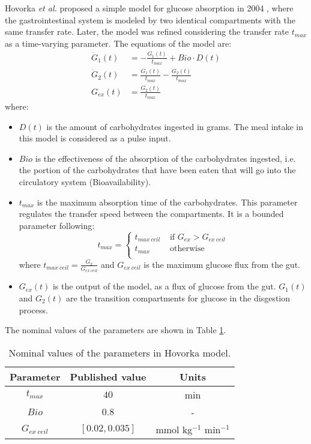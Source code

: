 Hovorka \textit{et al.} proposed a simple model for glucose absorption in 2004 \cite{hovorka2004nonlinear}, where the gastrointestinal system is modeled by two identical compartments with the same transfer rate. Later, the model was refined \cite{simuladorhovorka} considering the transfer rate $t_{max}$ as a time-varying parameter. The equations of the model are:
\begin{align}
	\dot{G}_{1}(t) &=-\frac{G_{1}(t)}{t_{max}}+Bio\cdot D(t) \label{eq:hovorkagut1}\\
	\dot{G}_{2}(t) &=\frac{G_{1}(t)}{t_{max}}-\frac{G_{2}(t)}{t_{max}} \label{eq:hovorkagut2}\\
	G_{ex}(t) &=\frac{G_{2}(t)}{t_{max}} \label{eq:hovorkagut3}
\end{align}
where:
\begin{itemize}
	\item \textbf{$D(t)$} is the amount of carbohydrates ingested in grams. The meal intake in this model is considered as a pulse input.
	\item \textbf{$Bio$} is the effectiveness of the absorption of the carbohydrates ingested, i.e. the portion of the carbohydrates that have been eaten that will go into the circulatory system (Bioavailability).
	\item \textbf{$t_{max}$} is the maximum absorption time of the carbohydrates. This parameter regulates the transfer speed between the compartments. It is a bounded parameter following:
	\begin{equation} 
	  t_{max}=\left\{ \begin{array}{cc} 
	  t_{max\ ceil} & \mbox{ if } G_{ex} > G_{ex\ ceil} \\ 
	  t_{max} & \mbox{ otherwise } \\	
	  \end{array} \right.
	\label{eq:hovorkagut4}
	\end{equation}
	where $t_{max\ ceil}=\frac{G_{2}}{G_{ex\ ceil}}$ and $G_{ex\ ceil}$ is the maximum glucose flux from the gut.
	\item \textbf{$G_{ex}(t)$} is the output of the model, as a flux of glucose from the gut. $G_{1}(t)$ and $G_{2}(t)$ are the transition compartments for glucose in the disgestion process.
\end{itemize}
The nominal values of the parameters are shown in Table \ref{tab:hovorkagut}.

\begin{table}[hbtp]
	\centering
		\begin{tabular}{|c c c|}
		\hline 
		Parameter & Published value & Units \\
		\hline 
		$t_{max}$ & $40$ & min \\
		$Bio$ & $0.8$ & - \\
		$G_{ex\ ceil}$ & $[0.02, 0.035]$ & mmol kg$^{-1}$ min$^{-1}$ \\
		\hline
		\end{tabular}
	\caption{Nominal values of the parameters in Hovorka model.}
	\label{tab:hovorkagut}
\end{table}

